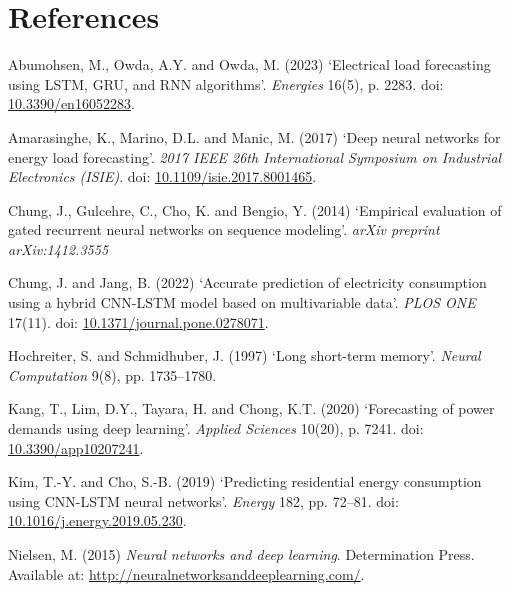 \documentclass[
]{article}
\newlength{\cslhangindent}
\newenvironment{CSLReferences}[2] %
 {\begin{list}{}{%
  \setlength{\itemindent}{0pt}
  \setlength{\leftmargin}{0pt}
  \setlength{\parsep}{0pt}
  \ifodd #1
   \setlength{\leftmargin}{\cslhangindent}
   \setlength{\itemindent}{-1\cslhangindent}
  \fi
  \setlength{\itemsep}{#2\baselineskip}}}
 {\end{list}}
\begin{document}
\section*{References}\label{references}

\label{refs}
\begin{CSLReferences}{0}{1}
Abumohsen, M., Owda, A.Y. and Owda, M. (2023) {`Electrical load
forecasting using LSTM, GRU, and RNN algorithms'}. \emph{Energies}
16(5), p. 2283. doi:
\href{https://doi.org/10.3390/en16052283}{10.3390/en16052283}.

Amarasinghe, K., Marino, D.L. and Manic, M. (2017) {`Deep neural
networks for energy load forecasting'}. \emph{2017 IEEE 26th
International Symposium on Industrial Electronics (ISIE)}. doi:
\href{https://doi.org/10.1109/isie.2017.8001465}{10.1109/isie.2017.8001465}.

Chung, J., Gulcehre, C., Cho, K. and Bengio, Y. (2014) {`Empirical
evaluation of gated recurrent neural networks on sequence modeling'}.
\emph{arXiv preprint arXiv:1412.3555}

Chung, J. and Jang, B. (2022) {`Accurate prediction of electricity
consumption using a hybrid CNN-LSTM model based on multivariable data'}.
\emph{PLOS ONE} 17(11). doi:
\href{https://doi.org/10.1371/journal.pone.0278071}{10.1371/journal.pone.0278071}.

Hochreiter, S. and Schmidhuber, J. (1997) {`Long short-term memory'}.
\emph{Neural Computation} 9(8), pp. 1735--1780.

Kang, T., Lim, D.Y., Tayara, H. and Chong, K.T. (2020) {`Forecasting of
power demands using deep learning'}. \emph{Applied Sciences} 10(20), p.
7241. doi:
\href{https://doi.org/10.3390/app10207241}{10.3390/app10207241}.

Kim, T.-Y. and Cho, S.-B. (2019) {`Predicting residential energy
consumption using CNN-LSTM neural networks'}. \emph{Energy} 182, pp.
72--81. doi:
\href{https://doi.org/10.1016/j.energy.2019.05.230}{10.1016/j.energy.2019.05.230}.

Nielsen, M. (2015) \emph{Neural networks and deep learning}.
Determination Press. Available at:
\url{http://neuralnetworksanddeeplearning.com/}.


\end{CSLReferences}
\end{document}
